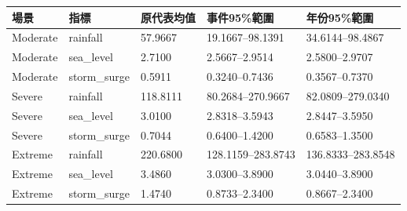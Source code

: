 \begin{tabular}{lllll}
\hline
場景 & 指標 & 原代表均值 & 事件95\%範圍 & 年份95\%範圍 \\
\hline
Moderate & rainfall & 57.9667 & 19.1667–98.1391 & 34.6144–98.4867 \\
Moderate & sea\_level & 2.7100 & 2.5667–2.9514 & 2.5800–2.9707 \\
Moderate & storm\_surge & 0.5911 & 0.3240–0.7436 & 0.3567–0.7370 \\
Severe & rainfall & 118.8111 & 80.2684–270.9667 & 82.0809–279.0340 \\
Severe & sea\_level & 3.0100 & 2.8318–3.5943 & 2.8447–3.5950 \\
Severe & storm\_surge & 0.7044 & 0.6400–1.4200 & 0.6583–1.3500 \\
Extreme & rainfall & 220.6800 & 128.1159–283.8743 & 136.8333–283.8548 \\
Extreme & sea\_level & 3.4860 & 3.0300–3.8900 & 3.0440–3.8900 \\
Extreme & storm\_surge & 1.4740 & 0.8733–2.3400 & 0.8667–2.3400 \\
\hline
\end{tabular}
